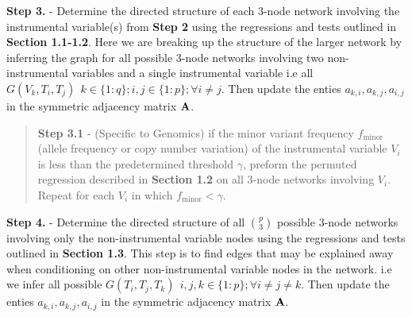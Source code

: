 \documentclass[12pt]{report}
\begin{document}
\noindent \textbf{Step 3.} - Determine the directed structure of each 3-node network involving the instrumental variable(s) from \textbf{Step 2} using the regressions and tests outlined in \textbf{Section 1.1-1.2}. Here we are breaking up the structure of the larger network by inferring the graph for all possible 3-node networks involving two non-instrumental variables and a single instrumental variable i.e all $G(V_k, T_i, T_j) \ \ k \in \{1:q\}; i,j \in \{1:p\}; \forall i\neq j$. Then update the enties $a_{k,i}, a_{k,j}, a_{i,j}$ in the symmetric adjacency matrix $\bf A$. 

\begin{quote}
\textbf{Step 3.1} - (Specific to Genomics) if the minor variant frequency $f_{\text{minor}}$ (allele frequency or copy number variation) of the instrumental variable $V_i$ is less than the predetermined threshold $\gamma$, preform the permuted regression described in \textbf{Section 1.2} on all 3-node networks involving $V_i$. Repeat for each $V_i$ in which $f_{\text{minor}} < \gamma$. 
\end{quote}

\noindent \textbf{Step 4.} -  Determine the directed structure of all $p\choose 3$ possible 3-node networks involving only the non-instrumental variable nodes using the regressions and tests outlined in \textbf{Section 1.3}. This step is to find edges that may be explained away when conditioning on other non-instrumental variable nodes in the network. i.e we infer all possible $G(T_i, T_j, T_k) \ \ i,j,k\in\{1:p\}; \forall i\neq j\neq k$.  Then update the enties $a_{k,i}, a_{k,j}, a_{i,j}$ in the symmetric adjacency matrix $\bf A$. 











\newpage
\end{document}
